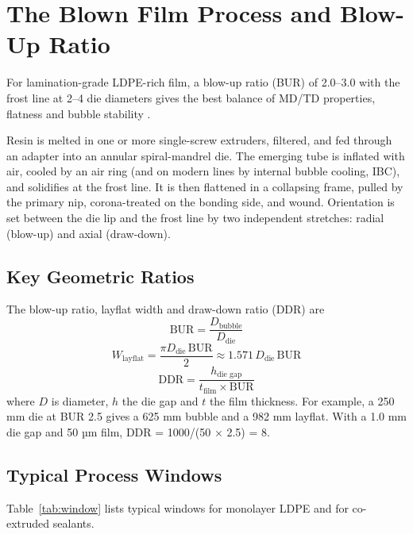 \documentclass[10pt,twocolumn,a4paper]{article}
\begin{document}
\section{The Blown Film Process and Blow-Up Ratio}

For lamination-grade LDPE-rich film, a blow-up ratio (BUR) of 2.0–3.0 with the frost line at 2–4 die diameters gives the best balance of MD/TD properties, flatness and bubble stability \cite{cantor}.

Resin is melted in one or more single-screw extruders, filtered, and fed through an adapter into an annular spiral-mandrel die. The emerging tube is inflated with air, cooled by an air ring (and on modern lines by internal bubble cooling, IBC), and solidifies at the frost line. It is then flattened in a collapsing frame, pulled by the primary nip, corona-treated on the bonding side, and wound. Orientation is set between the die lip and the frost line by two independent stretches: radial (blow-up) and axial (draw-down).

\subsection{Key Geometric Ratios}

The blow-up ratio, layflat width and draw-down ratio (DDR) are
\begin{equation}
\mathrm{BUR} = \frac{D_{\text{bubble}}}{D_{\text{die}}}
\end{equation}
\begin{equation}
W_{\text{layflat}} = \frac{\pi D_{\text{die}}\,\mathrm{BUR}}{2} \approx 1.571\,D_{\text{die}}\,\mathrm{BUR}
\end{equation}
\begin{equation}
\mathrm{DDR} = \frac{h_{\text{die gap}}}{t_{\text{film}} \times \mathrm{BUR}}
\end{equation}
where $D$ is diameter, $h$ the die gap and $t$ the film thickness. For example, a 250 mm die at BUR 2.5 gives a 625 mm bubble and a 982 mm layflat. With a 1.0 mm die gap and 50 µm film, DDR = 1000/(50 × 2.5) = 8.

\subsection{Typical Process Windows}

Table~\ref{tab:window} lists typical windows for monolayer LDPE and for co-extruded sealants.
\end{document}
